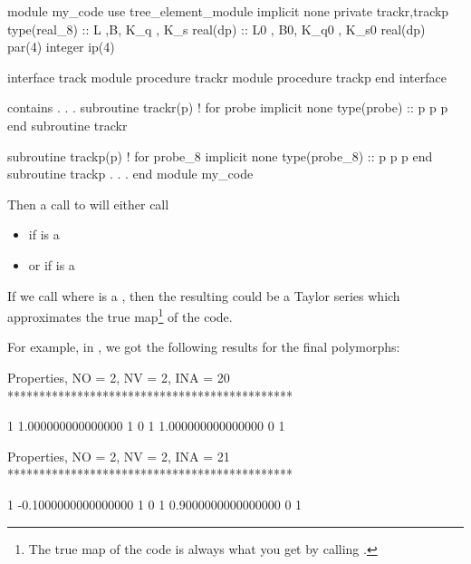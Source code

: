 \documentclass[english,12pt,article]{article} %
\begin{document}
{   \begin{code}
      module my_code
      use tree_element_module
      implicit none
      private trackr,trackp
      type(real_8)  :: L ,B, K_q , K_s 
      real(dp) :: L0 , B0, K_q0 , K_s0 
      real(dp) par(4)
      integer ip(4)
      
      interface track
       module procedure trackr
       module procedure trackp 
      end interface
      
      contains
                        .
                        .
                        .
      subroutine trackr(p) ! for probe
      implicit none
      type(probe) :: p
       p%
       p%
      end subroutine trackr
      
      subroutine trackp(p) ! for probe_8
      implicit none
      type(probe_8) :: p
       p%
       p%
      end subroutine trackp
                        .
                        .
                        .
      end module my_code
   \end{code}
    
    Then a call to  will either call 
    
    \begin{itemize} 
       \item {} if  is a 
       \item or  if  is a 
     \end{itemize}  
    
    If we call     where  is a  , then the resulting      could be a Taylor series which approximates the true map\footnote{The true map of the code is always what you get by calling .} of the code.
    
    For example, in , we got the following results for the final polymorphs: 
    
    
    \begin{example1}
 Properties, NO =    2, NV =    2, INA =   20
 *********************************************

   1   1.000000000000000       1  0
   1   1.000000000000000       0  1


 Properties, NO =    2, NV =    2, INA =   21
 *********************************************

   1 -0.1000000000000000       1  0
   1  0.9000000000000000       0  1
\end{example1}

}
\end{document}

